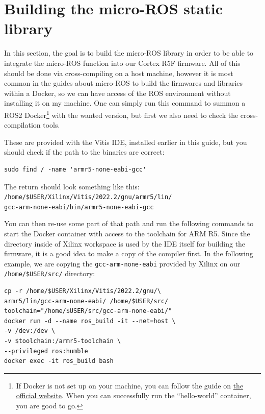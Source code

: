 \documentclass[10pt]{article}
\begin{document}
\section{Building the micro-ROS static library}
\label{sec:building-micro-ros}
In this section, the goal is to build the micro-ROS library in order to be
able to integrate the micro-ROS function into our Cortex R5F firmware.
All of this should be done via cross-compiling on a host machine, however
it is most common in the guides about micro-ROS to build the firmwares and libraries within a Docker,
so we can have access of the ROS environment without installing it on my machine.
One can simply run this command to summon a ROS2 Docker\footnote{If Docker is not set up on your machine, you can follow the guide on \href{https://docs.docker.com/engine/install/ubuntu/}{the official website}. When you can successfully run the ``hello-world'' container, you are good to go.} with the wanted version, but first we also need to check the cross-compilation tools.

These are provided with the Vitis IDE, installed earlier in this guide, but
you should check if the path to the binaries are correct:

\begin{tcolorbox}
\begin{verbatim}
sudo find / -name 'armr5-none-eabi-gcc'
\end{verbatim}
\end{tcolorbox}

The return should look something like this:\\
\verb|/home/$USER/Xilinx/Vitis/2022.2/gnu/armr5/lin/|\\
\verb|gcc-arm-none-eabi/bin/armr5-none-eabi-gcc|

You can then re-use some part of that path and run the following commands to start the
Docker container with access to the toolchain for ARM R5.
Since the directory inside of Xilinx workspace is used by the IDE itself for building
the firmware, it is a good idea to make a copy of the compiler first.
In the following example, we are copying the \verb|gcc-arm-none-eabi| provided by
Xilinx on our \verb|/home/$USER/src/| directory:
\begin{tcolorbox}
\begin{verbatim}
cp -r /home/$USER/Xilinx/Vitis/2022.2/gnu/\
armr5/lin/gcc-arm-none-eabi/ /home/$USER/src/
toolchain="/home/$USER/src/gcc-arm-none-eabi/"
docker run -d --name ros_build -it --net=host \
-v /dev:/dev \
-v $toolchain:/armr5-toolchain \
--privileged ros:humble
docker exec -it ros_build bash
\end{verbatim}
\end{tcolorbox}
\end{document}
